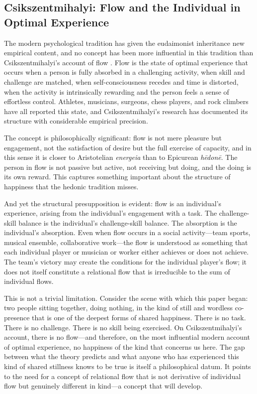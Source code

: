 \subsection{Csikszentmihalyi: Flow and the Individual in Optimal Experience}
\label{p14:subsec:flow}

\noindent
The modern psychological tradition has given the eudaimonist inheritance new empirical content, and no concept has been more influential in this tradition than Csikszentmihalyi's account of flow \parencite{csikszentmihalyi1990}. Flow is the state of optimal experience that occurs when a person is fully absorbed in a challenging activity, when skill and challenge are matched, when self-consciousness recedes and time is distorted, when the activity is intrinsically rewarding and the person feels a sense of effortless control. Athletes, musicians, surgeons, chess players, and rock climbers have all reported this state, and Csikszentmihalyi's research has documented its structure with considerable empirical precision.

The concept is philosophically significant: flow is not mere pleasure but engagement, not the satisfaction of desire but the full exercise of capacity, and in this sense it is closer to Aristotelian \emph{energeia} than to Epicurean \emph{h\={e}don\={e}}. The person in flow is not passive but active, not receiving but doing, and the doing is its own reward. This captures something important about the structure of happiness that the hedonic tradition misses.

And yet the structural presupposition is evident: flow is an individual's experience, arising from the individual's engagement with a task. The challenge-skill balance is the individual's challenge-skill balance. The absorption is the individual's absorption. Even when flow occurs in a social activity---team sports, musical ensemble, collaborative work---the flow is understood as something that each individual player or musician or worker either achieves or does not achieve. The team's victory may create the conditions for the individual player's flow; it does not itself constitute a relational flow that is irreducible to the sum of individual flows.

This is not a trivial limitation. Consider the scene with which this paper began: two people sitting together, doing nothing, in the kind of still and wordless co-presence that is one of the deepest forms of shared happiness. There is no task. There is no challenge. There is no skill being exercised. On Csikszentmihalyi's account, there is no flow---and therefore, on the most influential modern account of optimal experience, no happiness of the kind that concerns us here. The gap between what the theory predicts and what anyone who has experienced this kind of shared stillness knows to be true is itself a philosophical datum. It points to the need for a concept of relational flow that is not derivative of individual flow but genuinely different in kind---a concept that  will develop.

